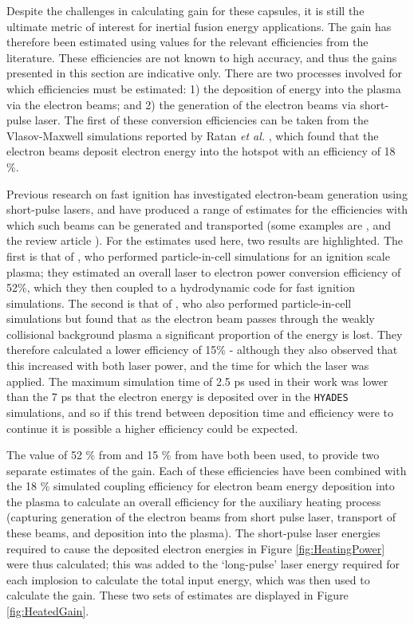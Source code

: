 Despite the challenges in calculating gain for these capsules, it is still the ultimate metric of interest for inertial fusion energy applications. The gain has therefore been estimated using values for the relevant efficiencies from the literature. These efficiencies are not known to high accuracy, and thus the gains presented in this section are indicative only. There are two processes involved for which efficiencies must be estimated: 1) the deposition of energy into the plasma via the electron beams; and 2) the generation of the electron beams via short-pulse laser. The first of these conversion efficiencies can be taken from the Vlasov-Maxwell simulations reported by Ratan \textit{et al.} \cite{Ratan2017}, which found that the electron beams deposit electron energy into the hotspot with an efficiency of 18 \%.

Previous research on fast ignition has investigated electron-beam generation using short-pulse lasers, and have produced a range of estimates for the efficiencies with which such beams can be generated and transported (some examples are \cite{Ma2012, Kemp2014, Kemp2009}, and the review article \cite{Norreys2014}). For the estimates used here, two results are highlighted. The first is that of \cite{Strozzi2012}, who performed particle-in-cell simulations for an ignition scale plasma; they estimated an overall laser to electron power conversion efficiency of 52\%, which they then coupled to a hydrodynamic code for fast ignition simulations. The second is that of \cite{Tonge2009}, who also performed particle-in-cell simulations but found that as the electron beam passes through the weakly collisional background plasma a significant proportion of the energy is lost. They therefore calculated a lower efficiency of 15\% - although they also observed that this increased with both laser power, and the time for which the laser was applied. The maximum simulation time of 2.5 ps used in their work was lower than the 7 ps that the electron energy is deposited over in the \texttt{HYADES} simulations, and so if this trend between deposition time and efficiency were to continue it is possible a higher efficiency could be expected.

The value of 52 \% from \cite{Strozzi2012} and 15 \% from \cite{Tonge2009} have both been used, to provide two separate estimates of the gain. Each of these efficiencies have been combined with the 18 \% simulated coupling efficiency for electron beam energy deposition into the plasma to calculate an overall efficiency for the auxiliary heating process (capturing generation of the electron beams from short pulse laser, transport of these beams, and deposition into the plasma). The short-pulse laser energies required to cause the deposited electron energies in Figure \ref{fig:HeatingPower} were thus calculated; this was added to the `long-pulse' laser energy required for each implosion to calculate the total input energy, which was then used to calculate the gain. These two sets of estimates are displayed in Figure \ref{fig:HeatedGain}.

